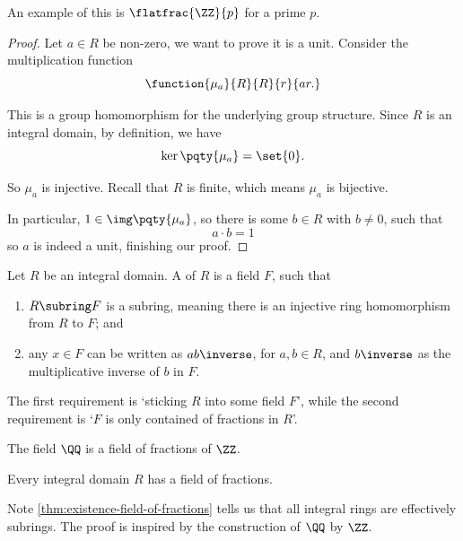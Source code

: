 An example of this is \(\flatfrac{\ZZ}{p}\) for a prime \(p\).

\begin{proof}
    Let \(a \in R\) be non-zero, we want to prove it is a unit. Consider the multiplication function
    \[
        \function{\mu_a}{R}{R}{r}{ar.}
    \]

    This is a group homomorphism for the underlying group structure. Since \(R\) is an integral domain, by definition, we have
    \[
        \ker \pqty{\mu_a} = \set{0}.
    \]

    So \(\mu_a\) is injective. Recall that \(R\) is finite, which means \(\mu_a\) is bijective.

    In particular, \(1 \in \img \pqty{\mu_a}\), so there is some \(b \in R\) with \(b \neq 0\), such that
    \[
        a \cdot b = 1
    \]
    so \(a\) is indeed a unit, finishing our proof.
\end{proof}

\begin{definition}
    \label{def:field-of-fractions}%
    Let \(R\) be an integral domain. A  of \(R\) is a field \(F\), such that
    \begin{enumerate}
        \item \(R \subring F\) is a subring, meaning there is an injective ring homomorphism from \(R\) to \(F\); and
        \item any \(x \in F\) can be written as \(a b \inverse\), for \(a, b \in R\), and \(b\inverse\) as the multiplicative inverse of \(b\) in \(F\).
    \end{enumerate}
\end{definition}

The first requirement is `sticking \(R\) into some field \(F\)', while the second requirement is `\(F\) is only contained of fractions in \(R\)'.

\begin{example*}
    \label{ex:field-of-fractions-z}%
    The field \(\QQ\) is a field of fractions of \(\ZZ\).
\end{example*}

\begin{theorem}
    \label{thm:existence-field-of-fractions}%
    Every integral domain \(R\) has a field of fractions.
\end{theorem}

Note \autoref{thm:existence-field-of-fractions} tells us that all integral rings are effectively subrings. The proof is inspired by the construction of \(\QQ\) by \(\ZZ\).

